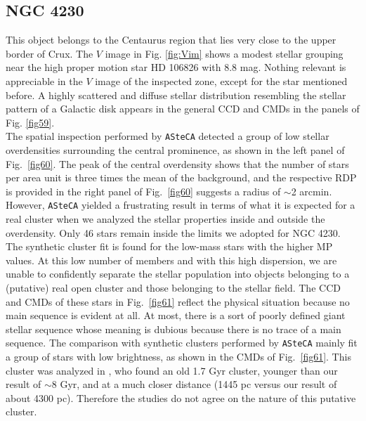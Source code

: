 \documentclass[draft]{aa}
\begin{document}
\subsection{NGC 4230}

This object belongs to the Centaurus region that lies very close to the upper
border of Crux. The $V$ image in Fig. \ref{fig:Vim} shows a modest stellar grouping near the high proper motion star HD 106826 with 8.8
mag.
Nothing relevant is appreciable in the $V$ image of the inspected zone, except for
the star mentioned before. A highly scattered and diffuse stellar distribution
resembling the stellar pattern of a Galactic disk appears in the general CCD
and CMDs in the panels of Fig. \ref{fig59}.\\

The spatial inspection performed by \texttt{ASteCA} detected a group of low
stellar overdensities surrounding the central prominence, as shown in the left
panel of Fig.~\ref{fig60}. The peak of the central overdensity shows that the
number of stars per area unit is three times the mean of the background, and the
respective RDP is provided in the right panel of Fig.~\ref{fig60} suggests a
radius of $\sim$2 arcmin.
However, \texttt{ASteCA} yielded a frustrating result in terms of what
it is expected for a real cluster when we analyzed the stellar properties inside
and outside the overdensity.
Only 46 stars remain inside the limits we adopted for NGC 4230. The synthetic
cluster fit is found for the low-mass stars with the higher MP values. At this
low number of members and with this high dispersion, we are unable to
confidently separate the stellar population into objects belonging to a 
(putative) real open cluster and those belonging to the stellar field.
%
The CCD and CMDs of these stars in Fig.~\ref{fig61} reflect the physical
situation because no main sequence is evident at all. At most, there is a sort of
poorly defined giant stellar sequence whose meaning is dubious because there is no
trace of a main sequence.
The comparison with synthetic clusters performed by \texttt{ASteCA}
mainly fit a group of stars with low brightness, as shown in the CMDs of
Fig.~\ref{fig61}. This cluster was analyzed in \cite{Tadross_2011}, who found an old 1.7 Gyr cluster, younger than our result of $\sim$8 Gyr,
and at a much closer distance (1445 pc versus our result of about 4300 pc).
Therefore the studies do not agree on the nature of this putative cluster.\\
\end{document}
